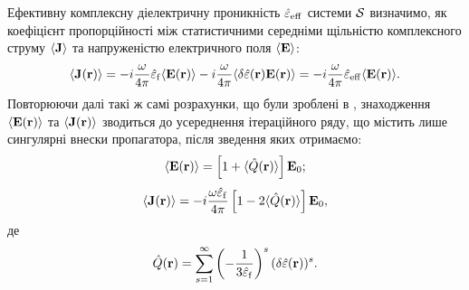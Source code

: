 \documentclass[14pt,twoside]{vakthesis}
\begin{document}
Ефективну комплексну діелектричну проникність $\hat{\varepsilon}_{\rm eff}$ системи $\cal S$ визначимо, 
як коефіцієнт пропорційності між статистичними середніми щільністю комплексного струму $\langle{\bf J}\rangle$ та напруженістю електричного поля $\langle {\bf E} \rangle$:
\begin{equation}\label{eq:eff_complex}
\langle {\bf{J}} ({\bf{r}})\rangle =-i\frac{\omega}{4\pi} \hat{\varepsilon}_{\rm f} \langle {\bf{E}} ({\bf{r}}) \rangle
-i\frac{\omega}{4\pi}\langle \delta\hat{\varepsilon} ({\bf{r}}) {\bf{E}}
({\bf{r}}) \rangle = -i\frac{\omega}{4\pi} \hat{\varepsilon}_{\rm
	eff} \langle {\bf{E}} ({\bf{r}}) \rangle.
\end{equation}
Повторюючи далі такі ж самі розрахунки, що були зроблені в \cite{Sushko2007, Sushko2017}, знаходження $\langle {\bf E}({\bf r}) \rangle$ та $\langle {\bf J}({\bf r}) \rangle$ зводиться до усереднення ітераційного ряду, що містить лише сингулярні внески пропагатора, після зведення яких отримаємо:
\begin{equation}\label{eq:E_average-complex}
\langle {\bf E} ({\bf r}) \rangle = \left[ 1 + \langle \hat{Q}({\bf r}) \rangle \right] {\bf E}_0;
\end{equation}
\begin{equation}\label{eq:C_average}
\langle {\bf J} ({\bf r}) \rangle = - i \frac{\omega\hat{\varepsilon}_{\rm f}}{4\pi} \left[ 1 - 2\langle \hat{Q}({\bf r}) \rangle \right] {\bf E}_0,
\end{equation}
де
\begin{equation}\label{eq:Q-complex}
\hat{Q}({\bf r}) = \sum\limits_{s=1}^{\infty} \left( - \frac{1}{3\hat{\varepsilon}_{\rm f}} \right)^s (\delta\hat{\varepsilon}({\bf r}))^s.
\end{equation}
\end{document}
